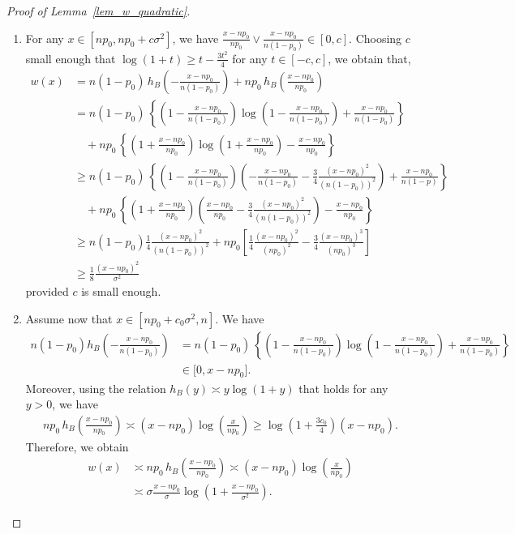 \documentclass{article}
\begin{document}
\begin{proof}[Proof of Lemma~\ref{lem_w_quadratic}]
\begin{enumerate}
    \item For any $x \in [np_0, np_0 + c\sigma^2]$, we have $\frac{x-np_0}{np_0} \lor \frac{x-np_0}{n(1-p_0)}\in [0, c]$.  Choosing $c$ small enough that $\log(1+t) \geq t - \frac{3t^2}{4}$ for any $t \in [-c, c]$, we obtain that, 
    \begin{align*}
        w(x) &= n(1-p_0) \, h_B\!\left(-\frac{x-np_0}{n(1-p_0)}\right) + np_0 \, h_B\!\left(\frac{x-np_0}{np_0}\right)\\[5pt]
        & = n(1-p_0) \, \left\{\left(1 - \frac{x-np_0}{n(1-p_0)}\right) \log\left(1-\frac{x-np_0}{n(1-p_0)}\right) + \frac{x-np_0}{n(1-p_0)}\right\} \\[5pt]
        & \quad + np_0 \, \left\{\left(1 + \frac{x-np_0}{np_0}\right) \log\left(1+\frac{x-np_0}{np_0}\right) - \frac{x-np_0}{np_0}\right\}\\[5pt]
        & \geq n(1-p_0) \, \left\{\left(1 - \frac{x-np_0}{n(1-p_0)}\right) \left(-\frac{x-np_0}{n(1-p_0)} -\frac{3}{4}\frac{(x-np_0)^2}{(n(1-p_0))^2}\right) + \frac{x-np_0}{n(1-p)}\right\} \\[5pt]
        & \quad + np_0 \, \left\{\left(1 + \frac{x-np_0}{np_0}\right) \left(\frac{x-np_0}{np_0} - \frac{3}{4}\frac{(x-np_0)^2}{(n(1-p_0))^2}\right) - \frac{x-np_0}{np_0} \right\}\\[5pt]
        & \geq n(1-p_0) \frac{1}{4}\frac{(x-np_0)^2}{(n(1-p_0))^2} + np_0\left[\frac{1}{4} \frac{(x-np_0)^2}{(np_0)^2} - \frac{3}{4}\frac{(x-np_0)^3}{(np_0)^3}\right]\\[5pt]
        & \geq \frac{1}{8} \frac{(x-np_0)^2}{\sigma^2}
    \end{align*}
    provided $c$ is small enough.

    \item Assume now that $x \in [np_0 + c_0\sigma^2, n]$. 
    We have 
    \begin{align*}
        n(1-p_0) h_B\left(-\frac{x-np_0}{n(1-p_0)}\right) &= n(1-p_0) \, \left\{\left(1 - \frac{x-np_0}{n(1-p_0)}\right) \log\left(1-\frac{x-np_0}{n(1-p_0)}\right) + \frac{x-np_0}{n(1-p_0)}\right\}\\
        & \in \big[0, x-np_0\big].
    \end{align*}
    Moreover, using the relation $h_B(y) \asymp y\log(1+y)$ that holds for any $y > 0$, we have
    \begin{align*}
        np_0 \, h_B \! \left(\frac{x-np_0}{np_0}\right) \asymp (x-np_0) \log\left(\frac{x}{np_0}\right) \geq \log\left(1+\frac{3c_0}{4}\right)(x-np_0).
    \end{align*}
    Therefore, we obtain
    \begin{align*}
        w(x) &\asymp np_0 \, h_B \! \left(\frac{x-np_0}{np_0}\right) \asymp (x-np_0) \log\left(\frac{x}{np_0}\right)\\
        & \asymp \sigma \frac{x-np_0}{\sigma} \log\left(1+ \frac{x-np_0}{\sigma^2}\right).
    \end{align*}
    \end{enumerate}
\end{proof}
\end{document}
